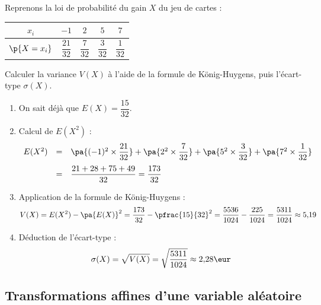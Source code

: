 \begin{methode}
	Reprenons la loi de probabilité du gain $X$ du jeu de cartes :
	\begin{center}
		\begin{tabular}{|c|c|c|c|c|} \hline
			\ccg$x_i$                               & $-1$             & $2$             & $5$             & $7$             \\ \hline
			\ccg\rule[-4mm]{0mm}{11mm}$\p{X = x_i}$ & $\dfrac{21}{32}$ & $\dfrac{7}{32}$ & $\dfrac{3}{32}$ & $\dfrac{1}{32}$ \\ \hline
		\end{tabular}
	\end{center}

	Calculer la variance $V(X)$ à l'aide de la formule de König-Huygens, puis l'écart-type $\sigma(X)$.

	\begin{correction}
		\nline
		\begin{enumerate}
			\item On sait déjà que $E(X) = \dfrac{15}{32}$.
			\item Calcul de $E(X^2)$ :
			      \[
				      \def\arraystretch{1.5}
				      \begin{array}{rcl}
					      E(X^2) & = & \pa{(-1)^2 \times \dfrac{21}{32}}+ \pa{2^2 \times \dfrac{7}{32}} + \pa{5^2 \times \dfrac{3}{32}} + \pa{7^2 \times \dfrac{1}{32}} \\[3mm]
					             & = & \dfrac{21 + 28 + 75 + 49}{32} = \dfrac{173}{32}
				      \end{array}
			      \]

			\item Application de la formule de König-Huygens :
			      \[
				      V(X) = E(X^2) - \pa{E(X)}^2 = \dfrac{173}{32} - \pfrac{15}{32}^2 = \dfrac{5536}{1024} - \dfrac{225}{1024} = \dfrac{5311}{1024} \approx 5{,}19
			      \]

			\item Déduction de l'écart-type :
			      \[
				      \sigma(X) = \sqrt{V(X)} = \sqrt{\dfrac{5311}{1024}} \approx 2{,}28\eur
			      \]
		\end{enumerate}
	\end{correction}
\end{methode}

\subsection{Transformations affines d'une variable aléatoire}

